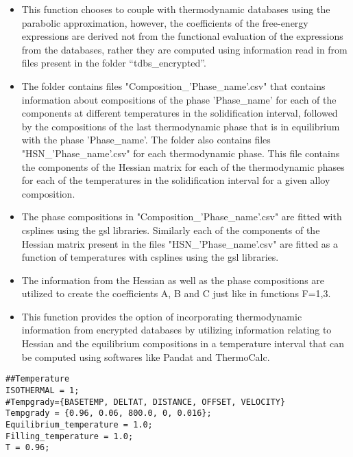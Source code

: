 \documentclass[a4paper,10pt]{article}
\begin{document}
\begin{itemize}
 \item This function chooses to couple with thermodynamic databases using the parabolic approximation, however, the coefficients of the free-energy expressions are
 derived not from the functional evaluation of the expressions from the databases, rather they are computed using information read in from files present in the 
 folder ``tdbs\_encrypted''.
 \item The folder contains files "Composition\_'Phase\_name'.csv" that contains information about compositions of the phase 'Phase\_name' for each of the components at different 
 temperatures in the solidification interval, followed by the compositions of the last thermodynamic phase that is in equilibrium with the phase 'Phase\_name'.
 The folder also contains files "HSN\_'Phase\_name'.csv" for each thermodynamic phase. This file contains the components of the Hessian matrix for each of the thermodynamic 
 phases for each of the temperatures in the solidification interval for a given alloy composition. 
 \item The phase compositions in "Composition\_'Phase\_name'.csv" are fitted with csplines using the gsl libraries. Similarly each of the components of the Hessian 
 matrix present in the files "HSN\_'Phase\_name'.csv" are fitted as a function of temperatures with csplines using the gsl libraries.
 \item The information from the Hessian as well as the phase compositions are utilized to create the coefficients A, B and C just like in functions F=1,3.
 \item This function provides the option of incorporating thermodynamic information from encrypted databases by utilizing information relating to Hessian and the equilibrium 
 compositions in a temperature interval that can be computed using softwares like Pandat and ThermoCalc.
\end{itemize}



\begin{lstlisting}
##Temperature
ISOTHERMAL = 1;
#Tempgrady={BASETEMP, DELTAT, DISTANCE, OFFSET, VELOCITY}
Tempgrady = {0.96, 0.06, 800.0, 0, 0.016};
Equilibrium_temperature = 1.0;
Filling_temperature = 1.0;
T = 0.96;
\end{lstlisting}
\end{document}
